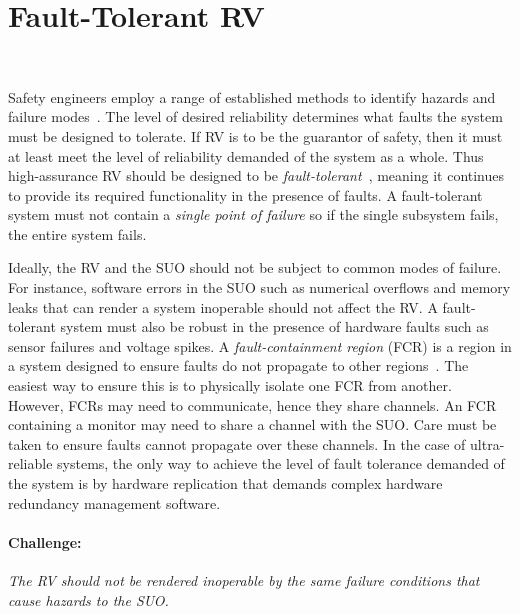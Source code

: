 \section{Fault-Tolerant RV}~\label{sec:ft}

 
Safety engineers employ a range of established methods to identify
hazards and failure modes~\cite{Levenson}.  The level of desired
reliability determines what faults the system must be designed to
tolerate. If RV is to be the guarantor of safety, then it must at
least meet the level of reliability demanded of the system as a whole.
Thus high-assurance RV should  be designed to be
\emph{fault-tolerant}~\cite{butler-faults}, meaning it continues
to provide its required functionality in the presence of faults.  A
fault-tolerant system must not contain a \emph{single point of
  failure} so  if the single subsystem fails, the entire system
fails.

 Ideally, the RV and the SUO should not be subject to common
 modes of failure.  For instance, software errors in the SUO such as
 numerical overflows and memory leaks that can render a system
 inoperable should not affect the RV.  A fault-tolerant system must
 also be robust in the presence of hardware faults such as sensor failures
 and voltage spikes.  A \emph{fault-containment region} (FCR)
 is a region in a system designed to ensure faults do not propagate to
 other regions~\cite{Rushby01:buscompare}.   The 
 easiest way to ensure this is to physically isolate one FCR from
 another.  However, FCRs may need to communicate, hence they share
 channels. An FCR containing a monitor may need to share a channel
 with the SUO.  Care must be taken to ensure faults cannot propagate
 over these channels. In the case of ultra-reliable systems, the only
 way to achieve the level of fault tolerance demanded of the system is
 by hardware replication that demands complex hardware redundancy
 management software. 


\paragraph{Challenge:}   \emph{The RV  should not be rendered inoperable by the
 same failure conditions that cause hazards to the SUO.}


